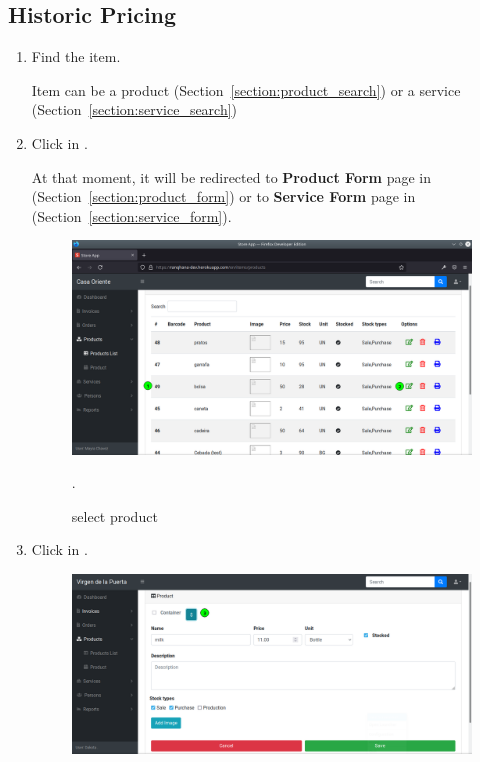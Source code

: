 \documentclass[a4paper,11pt]{refart}
\begin{document}
\subsection{Historic Pricing}\label{section:historic_pricing}
\begin{enumerate}
	\item Find the item.
	\medskip
	\begin{leftbar}
		Item can be a product (Section~\ref{section:product_search}) or a service (Section~\ref{section:service_search})
	\end{leftbar}
	\item Click in .
	\medskip
	\begin{leftbar}
		At that moment, it will be redirected to \textbf{Product Form} page in (Section~\ref{section:product_form}) or to \textbf{Service Form} page in (Section~\ref{section:service_form}).
	\end{leftbar}
	\begin{figure}[H]\centering
		\includegraphics[width=\textwidth]{images/produc_list-update.png}
		\caption{select product}
		\label{fig:select-product.png}.
	\end{figure}
	\item Click in \keys{\$}.
	\begin{figure}[H]\centering
		\includegraphics[width=\textwidth]{images/historing_price-open.png}

\end{figure}
\end{enumerate}
\end{document}
